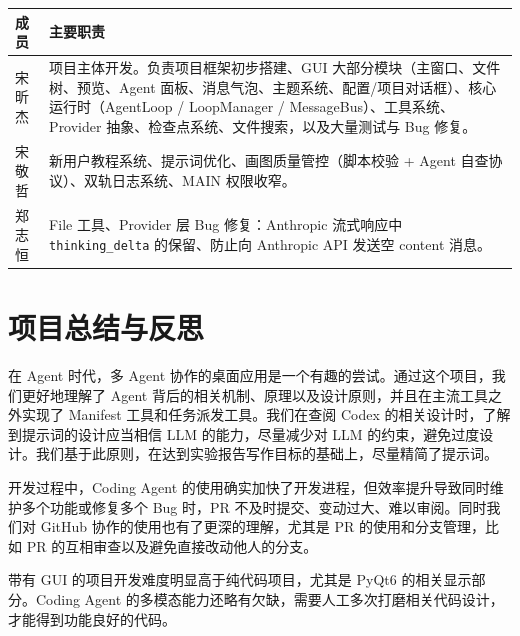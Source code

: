 \documentclass[a4paper,11pt]{article}
\begin{document}
\begin{table}[H]
\centering
\renewcommand{\arraystretch}{1.35}
\begin{tabularx}{\textwidth}{@{}p{2.2cm}X@{}}
\toprule
\textbf{成员} & \textbf{主要职责} \\
\midrule
宋昕杰 & 项目主体开发。负责项目框架初步搭建、GUI 大部分模块（主窗口、文件树、预览、Agent 面板、消息气泡、主题系统、配置/项目对话框）、核心运行时（AgentLoop / LoopManager / MessageBus）、工具系统、Provider 抽象、检查点系统、文件搜索，以及大量测试与 Bug 修复。 \\
宋敬哲 & 新用户教程系统、提示词优化、画图质量管控（脚本校验 + Agent 自查协议）、双轨日志系统、MAIN 权限收窄。 \\
郑志恒 & File 工具、Provider 层 Bug 修复：Anthropic 流式响应中 \texttt{thinking\_delta} 的保留、防止向 Anthropic API 发送空 content 消息。 \\
\bottomrule
\end{tabularx}
\end{table}

\section{项目总结与反思}

在 Agent 时代，多 Agent 协作的桌面应用是一个有趣的尝试。通过这个项目，我们更好地理解了 Agent 背后的相关机制、原理以及设计原则，并且在主流工具之外实现了 Manifest 工具和任务派发工具。我们在查阅 Codex\cite{codex} 的相关设计时，了解到提示词的设计应当相信 LLM 的能力，尽量减少对 LLM 的约束，避免过度设计。我们基于此原则，在达到实验报告写作目标的基础上，尽量精简了提示词。

开发过程中，Coding Agent 的使用确实加快了开发进程，但效率提升导致同时维护多个功能或修复多个 Bug 时，PR 不及时提交、变动过大、难以审阅。同时我们对 GitHub 协作的使用也有了更深的理解，尤其是 PR 的使用和分支管理，比如 PR 的互相审查以及避免直接改动他人的分支。

带有 GUI 的项目开发难度明显高于纯代码项目，尤其是 PyQt6 的相关显示部分。Coding Agent 的多模态能力还略有欠缺，需要人工多次打磨相关代码设计，才能得到功能良好的代码。
\end{document}

